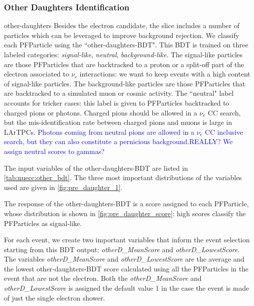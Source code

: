 \subsubsection{Other Daughters Identification}other-daughters
Besides the electron candidate, the slice includes a number of particles which can be leveraged to improve background rejection. We classify each PFParticle using the ``other-daughters-BDT". This BDT is trained on three labeled categories: \emph{signal-like}, \emph{neutral}, \emph{background-like}. The signal-like particles are those PFParticles that are backtracked to a proton or a split-off part of the electron associated to $\nu_e$ interactions: we want to keep events with a high content of signal-like particles. The background-like particles are those PFParticles that are backtracked to a simulated muon or cosmic activity.
The ``neutral" label accounts for tricker cases: this label is given to PFParticles backtracked to charged pions or photons. Charged pions should be allowed in a $\nu_e$ CC search, but the mis-identification rate between charged pions and muons is large in LArTPCs. \textcolor{blue}{Photons coming from neutral pions are allowed in a  $\nu_e$ CC inclusive search, but they can also constitute a pernicious background.REALLY? We assign neutral scores to gammas?} 

The input variables of the other-daughters-BDT are listed in \cref{tab:nuecc:other_bdt}.
The three most important distributions of the variables used are given in \cref{fig:pre_daughter_1}.  


The response of the other-daughters-BDT is a score assigned to each PFParticle, whose distribution is shown in \cref{fig:pre_daughter_score}: high scores classify the PFParticles as signal-like. 

For each event, we create two important variables that inform the event selection starting from this BDT output:  \emph{otherD\_MeanScore} and \emph{otherD\_LowestScore}.  The variables \emph{otherD\_MeanScore} and   \emph{otherD\_LowestScore} are the average and the lowest other-daughters-BDT score calculated using all the PFParticles in the event that are not the electron. Both the  \emph{otherD\_MeanScore} and  \emph{otherD\_LowestScore}  is assigned the default value 1 in the case the event is made of just the single electron shower.


